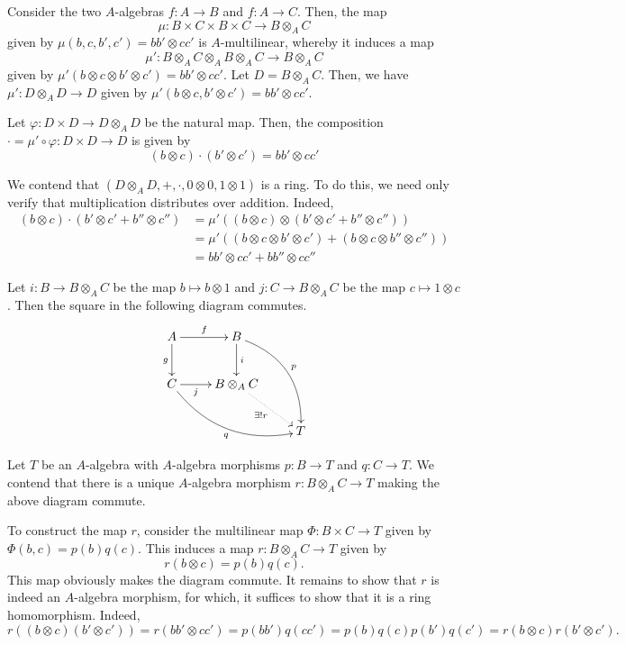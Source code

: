Consider the two $A$-algebras $f: A\to B$ and $f: A\to C$. Then, the map 
\begin{equation*}
    \mu: B\times C\times B\times C\to B\otimes_A C
\end{equation*}
given by $\mu(b,c,b',c') = bb'\otimes cc'$ is $A$-multilinear, whereby it induces a map 
\begin{equation*}
    \mu': B\otimes_A C\otimes_A B\otimes_A C\to B\otimes_A C 
\end{equation*}
given by $\mu'(b\otimes c\otimes b'\otimes c') = bb'\otimes cc'$. Let $D = B\otimes_A C$. Then, we have $\mu': D\otimes_A D\to D$ given by $\mu'(b\otimes c,b'\otimes c') = bb'\otimes cc'$.

Let $\varphi: D\times D\to D\otimes_A D$ be the natural map. Then, the composition $\cdot = \mu'\circ\varphi: D\times D\to D$ is given by 
\begin{equation*}
    (b\otimes c)\cdot(b'\otimes c') = bb'\otimes cc'
\end{equation*}

We contend that $(D\otimes_A D,+,\cdot,0\otimes 0, 1\otimes 1)$ is a ring. To do this, we need only verify that multiplication distributes over addition. Indeed, 
\begin{align*}
    (b\otimes c)\cdot(b'\otimes c' + b''\otimes c'') &= \mu'\left((b\otimes c)\otimes (b'\otimes c' + b''\otimes c'')\right)\\
    &= \mu'((b\otimes c\otimes b'\otimes c') + (b\otimes c\otimes b''\otimes c''))\\
    &= bb'\otimes cc' + bb''\otimes cc''
\end{align*}

Let $i: B\to B\otimes_A C$ be the map $b\mapsto b\otimes 1$ and $j: C\to B\otimes_A C$ be the map $c\mapsto 1\otimes c$. Then the square in the following diagram commutes.
\begin{equation*}
    \xymatrix {
        A\ar[r]^f\ar[d]_g & B\ar[d]^-i\ar@/^1.5pc/[rdd]^p\\
        C\ar@/_1.5pc/[drr]_q\ar[r]_-{j} & B\otimes_A C\ar@{.>}[rd]_{\exists!r}\\
        & & T
    }
\end{equation*} 

Let $T$ be an $A$-algebra with $A$-algebra morphisms $p: B\to T$ and $q: C\to T$. We contend that there is a unique $A$-algebra morphism $r: B\otimes_A C\to T$ making the above diagram commute. 

To construct the map $r$, consider the multilinear map $\Phi: B\times C\to T$ given by $\Phi(b, c) = p(b)q(c)$. This induces a map $r: B\otimes_A C\to T$ given by 
\begin{equation*}
    r(b\otimes c) = p(b)q(c).
\end{equation*}
This map obviously makes the diagram commute. It remains to show that $r$ is indeed an $A$-algebra morphism, for which, it suffices to show that it is a ring homomorphism. Indeed, 
\begin{equation*}
    r((b\otimes c)(b'\otimes c')) = r(bb'\otimes cc') = p(bb')q(cc') = p(b)q(c)p(b')q(c') = r(b\otimes c)r(b'\otimes c').
\end{equation*}

